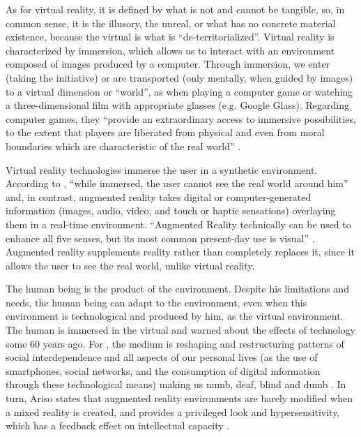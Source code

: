 \documentclass[english]{textolivre}
\begin{document}
As for virtual reality, it is defined by what is not and cannot be tangible, so, in common sense, it is the illusory, the unreal, or what has no concrete material existence, because the virtual is what is “de-territorialized”. Virtual reality is characterized by immersion, which allows us to interact with an environment composed of images produced by a computer. Through immersion, we enter (taking the initiative) or are transported (only mentally, when guided by images) to a virtual dimension or “world”, as when playing a computer game or watching a three-dimensional film with appropriate glasses (e.g. Google Glass). Regarding computer games, they “provide an extraordinary access to immersive possibilities, to the extent that players are liberated from physical and even from moral boundaries which are characteristic of the real world” \cite[p.~16]{ariso_is_2017}.

Virtual reality technologies immerse the user in a synthetic environment. According to \textcite[p.~1]{kipper_augmented_2013}, “while immersed, the user cannot see the real world around him” and, in contrast, augmented reality takes digital or computer-generated information (images, audio, video, and touch or haptic sensations) overlaying them in a real-time environment. “Augmented Reality technically can be used to enhance all five senses, but its most common present-day use is visual” \cite[p.~1]{kipper_augmented_2013}. Augmented reality supplements reality rather than completely replaces it, since it allows the user to see the real world, unlike virtual reality.

The human being is the product of the environment. Despite his limitations and needs, the human being can adapt to the environment, even when this environment is technological and produced by him, as the virtual environment. The human is immersed in the virtual and \textcite{mcluhan_understanding_1994} warned about the effects of technology some 60 years ago. For \textcite{mcluhan_understanding_1994}, the medium is reshaping and restructuring patterns of social interdependence and all aspects of our personal lives (as the use of smartphones, social networks, and the consumption of digital information through these technological means) making us numb, deaf, blind and dumb \cite[p.~17]{mcluhan_understanding_1994}. In turn, Ariso states that augmented reality environments are barely modified when a mixed reality is created, and provides a privileged look and hypersensitivity, which has a feedback effect on intellectual capacity \cite[p.~18]{ariso_is_2017}.
\end{document}
